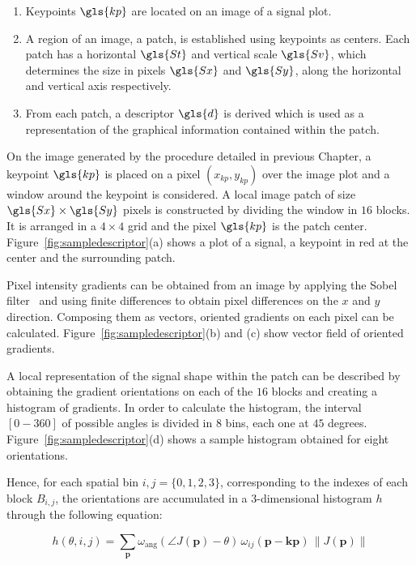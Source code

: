 \begin{enumerate}
\item Keypoints $\gls{kp}$ are located on an image of a signal plot.
\item A region of an image, a patch, is established using keypoints as centers.  Each patch has a horizontal $\gls{St}$ and vertical scale $\gls{Sv}$, which determines the size in pixels $\gls{Sx}$ and $\gls{Sy}$,  along the horizontal and vertical axis respectively. 
\item From each patch, a descriptor $\gls{d}$ is derived which is used as a representation of the graphical information contained within the patch.
\end{enumerate}

On the image generated by the procedure detailed in previous Chapter, a keypoint $\gls{kp}$ is placed on a pixel $(x_{kp}, y_{kp})$ over the image plot and a window around the keypoint is considered. A local image patch of size $\gls{Sx} \times \gls{Sy}$ pixels is constructed by dividing the window in $16$ blocks. It is arranged in a $4 \times 4$ grid and the pixel $\gls{kp}$ is the patch center.  Figure~\ref{fig:sampledescriptor}(a) shows a plot of a signal, a keypoint in red at the center and the surrounding patch.

Pixel intensity gradients can be obtained from an image by applying the Sobel filter~\cite{Szeliski2010} and using finite differences to obtain pixel differences on the $x$ and $y$ direction.  Composing them as vectors, oriented gradients on each pixel can be calculated.  Figure~\ref{fig:sampledescriptor}(b) and (c) show vector field of oriented gradients.

A local representation of the signal shape within the patch can be described by obtaining the gradient orientations on each of the $16$ blocks and creating a histogram of gradients.  In order to calculate the histogram, the interval $[0-360]$ of possible angles is divided in $8$ bins, each one at $45$ degrees.  Figure~\ref{fig:sampledescriptor}(d) shows a sample histogram obtained for eight orientations.

Hence, for each spatial bin $ i,j = \{0,1,2,3\} $, corresponding to the indexes of each block $B_{i,j}$,  the orientations are accumulated in a  $3$-dimensional histogram $h$ through the following equation: 
 

\begin{equation}
 h(\theta,i,j) = \sum_{\mathbf{p}} \omega_\mathrm{ang}(\angle J(\mathbf{p}) - \theta)\, \omega_{ij}\left(\mathbf{p} - \mathbf{kp} \right)\, \left\lVert J(\mathbf{p})\right\rVert 
\label{eq:histogram}
\end{equation}


